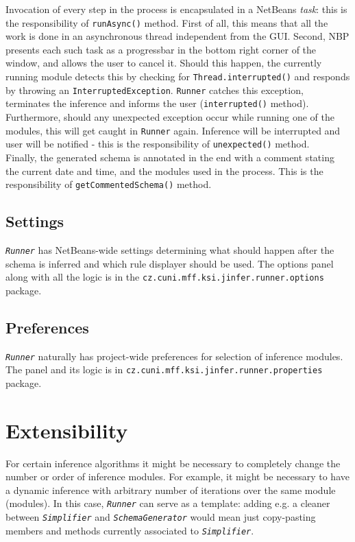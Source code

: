 \documentclass[a4paper,10pt,oneside]{article}
\newcommand{\code}[1]{\texttt{#1}}
\newcommand{\jmodule}[1]{\texttt{\textit{#1}}}
\begin{document}
Invocation of every step in the process is encapsulated in a NetBeans \emph{task}: this is the responsibility of \code{runAsync()} method. First of all, this means that all the work is done in an asynchronous thread independent from the GUI. Second, NBP presents each such task as a progressbar in the bottom right corner of the window, and allows the user to cancel it. Should this happen, the currently running module detects this  by checking for \code{Thread.interrupted()} and responds by throwing an \code{InterruptedException}. \code{Runner} catches this exception, terminates the inference and informs the user (\code{interrupted()} method).\\

Furthermore, should any unexpected exception occur while running one of the modules, this will get caught in \code{Runner} again. Inference will be interrupted and user will be notified - this is the responsibility of \code{unexpected()} method.\\

Finally, the generated schema is annotated in the end with a comment stating the current date and time, and the modules used in the process. This is the responsibility of \code{getCommentedSchema()} method.

\subsection{Settings}

\jmodule{Runner} has NetBeans-wide settings determining what should happen after the schema is inferred and which rule displayer should be used. The options panel along with all the logic is in the \code{cz.cuni.mff.ksi.jinfer.runner.options} package.

\subsection{Preferences}

\jmodule{Runner} naturally has project-wide preferences for selection of inference modules. The panel and its logic is in \code{cz.cuni.mff.ksi.jinfer.runner.properties} package.

\section{Extensibility}

For certain inference algorithms it might be necessary to completely change the number or order of inference modules. For example, it might be necessary to have a dynamic inference with arbitrary number of iterations over the same module (modules). In this case, \jmodule{Runner} can serve as a template: adding e.g. a cleaner between \jmodule{Simplifier} and \jmodule{SchemaGenerator} would mean just copy-pasting members and methods currently associated to \jmodule{Simplifier}.\\

\newpage


\end{document}

